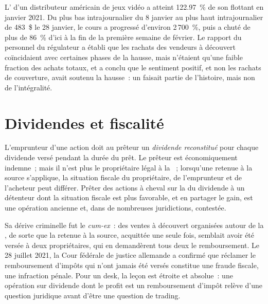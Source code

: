 \begin{example}[janvier 2021]\label{ex:m1:stock-loan-and-short-selling:gme}
L' d'un distributeur américain de jeux vidéo a atteint 122.97~\% de son flottant en
janvier 2021. Du plus bas intrajournalier du 8 janvier au plus haut intrajournalier de 483~\$
le 28 janvier, le cours a progressé d'environ 2\,700~\%, puis a chuté de plus de 86~\%
d'ici à la fin de la première semaine de février. Le rapport du personnel du régulateur a établi que
les rachats des vendeurs à découvert coïncidaient avec certaines phases de la hausse, mais n'étaient qu'une faible
fraction des achats totaux, et a conclu que le sentiment positif, et non les rachats
de couverture, avait soutenu la hausse~: un  faisait partie de l'histoire, mais non
de l'intégralité.
\end{example}

\section{Dividendes et fiscalité}

L'emprunteur d'une action doit au prêteur un \emph{dividende reconstitué} pour
chaque dividende versé pendant la durée du prêt. Le prêteur est économiquement indemne~; mais il
n'est plus le propriétaire légal à la ~; lorsqu'une retenue à la source
s'applique, la situation fiscale du propriétaire, de l'emprunteur et de l'acheteur peut différer. Prêter
des actions à cheval sur la  du dividende à un détenteur dont la situation fiscale est plus favorable, et
en partager le gain, est une opération ancienne et, dans de nombreuses juridictions, contestée.

Sa dérive criminelle fut le \emph{cum-ex}~: des ventes à découvert organisées autour de la
, de sorte que la retenue à la source, acquittée une seule fois, semblait avoir été
versée à deux propriétaires, qui en demandèrent tous deux le remboursement. Le 28 juillet 2021, la
Cour fédérale de justice allemande a confirmé que réclamer le remboursement d'impôts qui n'ont jamais
été versés constitue une fraude fiscale, une infraction pénale. Pour un desk, la leçon est
étroite et absolue~: une opération sur dividende dont le profit est un remboursement
d'impôt relève d'une question juridique avant d'être une question de trading.

